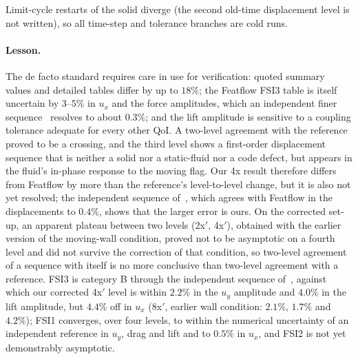 Limit-cycle restarts of the solid diverge (the second old-time displacement level is not written), so all time-step and tolerance branches are cold runs.

\paragraph{Lesson.}
The de facto standard requires care in use for verification: quoted summary values and detailed tables differ by up to $18\%$; the Featflow FSI3 table is itself uncertain by $3$--$5\%$ in $u_x$ and the force amplitudes, which an independent finer sequence~\citep{Failer2020} resolves to about $0.3\%$; and the lift amplitude is sensitive to a coupling tolerance adequate for every other QoI.
A two-level agreement with the reference proved to be a crossing, and the third level shows a first-order displacement sequence that is neither a solid nor a static-fluid nor a code defect, but appears in the fluid's in-phase response to the moving flag.
Our 4x result therefore differs from Featflow by more than the reference's level-to-level change, but it is also not yet resolved; the independent sequence of~\citet{Failer2020}, which agrees with Featflow in the displacements to $0.4\%$, shows that the larger error is ours.
On the corrected set-up, an apparent plateau between two levels (2x$'$, 4x$'$), obtained with the earlier version of the moving-wall condition, proved not to be asymptotic on a fourth level and did not survive the correction of that condition, so two-level agreement of a sequence with itself is no more conclusive than two-level agreement with a reference.
FSI3 is category B through the independent sequence of~\citet{Failer2020}, against which our corrected 4x$'$ level is within $2.2\%$ in the $u_y$ amplitude and $4.0\%$ in the lift amplitude, but $4.4\%$ off in $u_x$ (8x$'$, earlier wall condition: $2.1\%$, $1.7\%$ and $4.2\%$); FSI1 converges, over four levels, to within the numerical uncertainty of an independent reference in $u_y$, drag and lift and to $0.5\%$ in $u_x$, and FSI2 is not yet demonstrably asymptotic.

